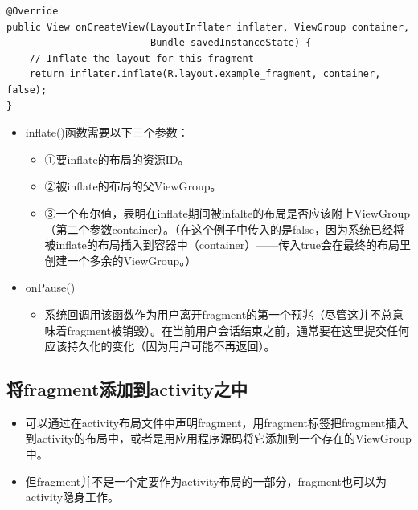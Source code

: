 \documentclass[9pt, b5paper]{article}
\begin{document}
\begin{itemize}
\begin{verbatim}
@Override
public View onCreateView(LayoutInflater inflater, ViewGroup container,
                         Bundle savedInstanceState) {　
    // Inflate the layout for this fragment
    return inflater.inflate(R.layout.example_fragment, container, false);
}
\end{verbatim}
\begin{itemize}
\item inflate()函数需要以下三个参数：
\begin{itemize}
\item ①要inflate的布局的资源ID。　
\item ②被inflate的布局的父ViewGroup。
\item ③一个布尔值，表明在inflate期间被infalte的布局是否应该附上ViewGroup（第二个参数container）。（在这个例子中传入的是false，因为系统已经将被inflate的布局插入到容器中（container）——传入true会在最终的布局里创建一个多余的ViewGroup。）　
\end{itemize}
\item onPause()
\begin{itemize}
\item 系统回调用该函数作为用户离开fragment的第一个预兆（尽管这并不总意味着fragment被销毁）。在当前用户会话结束之前，通常要在这里提交任何应该持久化的变化（因为用户可能不再返回）。
\end{itemize}
\end{itemize}
\end{itemize}

\subsection{将fragment添加到activity之中}
\label{sec-2-3}
\begin{itemize}
\item 可以通过在activity布局文件中声明fragment，用fragment标签把fragment插入到activity的布局中，或者是用应用程序源码将它添加到一个存在的ViewGroup中。　
\item 但fragment并不是一个定要作为activity布局的一部分，fragment也可以为activity隐身工作。
\end{itemize}
\end{document}

